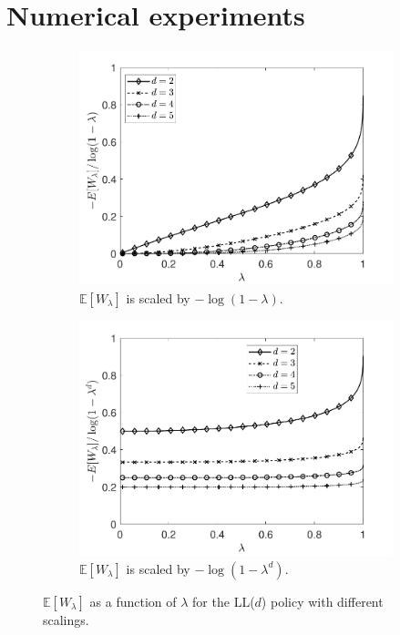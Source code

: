\documentclass[12pt]{report}
\newcommand{\E}{\mathbb{E}}
\begin{document}
\section{Numerical experiments} \label{sec:num_exp}
\begin{figure}[t]
\begin{subfigure}{0.45\textwidth}
\centering
\captionsetup{width=.8\linewidth}
\includegraphics[width=1\linewidth]{figures/Chapter5/fig1a.pdf}
\caption{$\E[W_\lambda]$ is scaled by $-\log(1-\lambda)$.}
\label{fig1a_heavy}
\end{subfigure}
\begin{subfigure}{0.45\textwidth}
\centering
\captionsetup{width=.8\linewidth}
\includegraphics[width=1\linewidth]{figures/Chapter5/fig1b.pdf}
\caption{$\E[W_\lambda]$ is scaled by $-\log(1-\lambda^d)$.}
\label{fig1b_heavy}
\end{subfigure}
\caption{$\E[W_\lambda]$ as a function of $\lambda$ for the LL($d$) policy with
different scalings.}
\label{fig1_heavy}
\end{figure}
\end{document}

